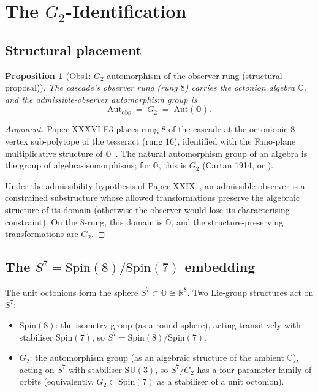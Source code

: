 \documentclass[12pt]{article}
\newtheorem{proposition}[theorem]{Proposition}
\theoremstyle{definition}
\theoremstyle{remark}
\newcommand{\Oo}{\mathbb{O}}
\newcommand{\Gtwo}{G_2}
\newcommand{\Spin}{\mathrm{Spin}}
\newcommand{\Aut}{\mathrm{Aut}}
\begin{document}
\section{The $\Gtwo$-Identification}\label{sec:G2-identification}

\subsection{Structural placement}

\begin{proposition}[Obs1: $\Gtwo$ automorphism of the observer rung (structural proposal)]\label{prop:G2-identification}
The cascade's observer rung (rung $8$) carries the octonion algebra $\Oo$, and the admissible-observer automorphism group is
\begin{equation}
\Aut_{\mathrm{obs}} \;=\; \Gtwo \;=\; \Aut(\Oo).
\end{equation}
\end{proposition}

\begin{proof}[Argument]
Paper XXXVI F3 places rung $8$ of the cascade at the octonionic $8$-vertex sub-polytope of the tesseract (rung $16$), identified with the Fano-plane multiplicative structure of $\Oo$~\citep{SmartXXXVI}. The natural automorphism group of an algebra is the group of algebra-isomorphisms; for $\Oo$, this is $\Gtwo$ (Cartan 1914, or \citep{Baez2002}).

Under the admissibility hypothesis of Paper XXIX~\citep{SmartXXIX}, an admissible observer is a constrained substructure whose allowed transformations preserve the algebraic structure of its domain (otherwise the observer would lose its characterising constraint). On the $8$-rung, this domain is $\Oo$, and the structure-preserving transformations are $\Gtwo$.
\end{proof}

\subsection{The $S^7 = \Spin(8)/\Spin(7)$ embedding}

The unit octonions form the sphere $S^7 \subset \Oo \cong \mathbb{R}^8$. Two Lie-group structures act on $S^7$:
\begin{itemize}
\item $\Spin(8)$: the isometry group (as a round sphere), acting transitively with stabiliser $\Spin(7)$, so $S^7 = \Spin(8) / \Spin(7)$.
\item $\Gtwo$: the automorphism group (as an algebraic structure of the ambient $\Oo$), acting on $S^7$ with stabiliser $\mathrm{SU}(3)$, so $S^7 / \Gtwo$ has a four-parameter family of orbits (equivalently, $\Gtwo \subset \Spin(7)$ as a stabiliser of a unit octonion).
\end{itemize}
\end{document}
